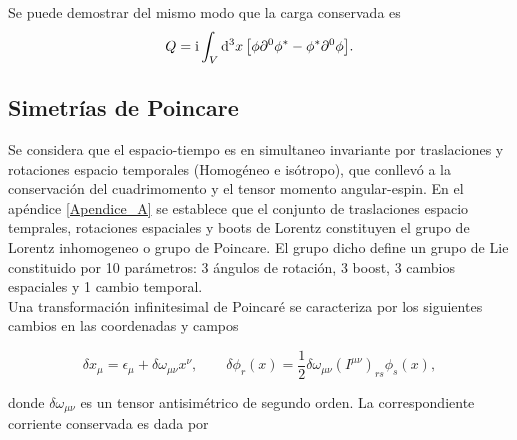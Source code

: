 Se puede demostrar del mismo modo que la carga conservada es
\begin{equation}
    Q = \mathrm{i} \int_{V} \dd[3]{x} \qty\big[\phi \partial^{0}\phi^{*} - \phi^{*} \partial^{0}\phi].
\end{equation}

\subsection{Simetrías de Poincare}

Se considera que el espacio-tiempo es en simultaneo invariante por traslaciones y rotaciones espacio temporales (Homogéneo e isótropo), que conllevó a la conservación del cuadrimomento y el tensor momento angular-espin. En el apéndice \ref{Apendice_A} se establece que el conjunto de traslaciones espacio temprales, rotaciones espaciales y boots de Lorentz constituyen el grupo de Lorentz inhomogeneo o grupo de Poincare. El grupo dicho define un grupo de Lie constituido por 10 parámetros: 3 ángulos de rotación, 3 boost, 3 cambios espaciales y 1 cambio temporal.\\

Una transformación infinitesimal de Poincaré se caracteriza por los siguientes cambios en las coordenadas y campos

\begin{equation}
    \delta x_\mu=\epsilon_\mu+\delta \omega_{\mu \nu} x^\nu, \quad\quad \delta \phi_r(x)=\frac{1}{2} \delta \omega_{\mu \nu}\left(I^{\mu \nu}\right)_{rs} \phi_s(x),
\end{equation}

donde $\delta \omega_{\mu \nu}$ es un tensor antisimétrico de segundo orden. La correspondiente corriente conservada es dada por


